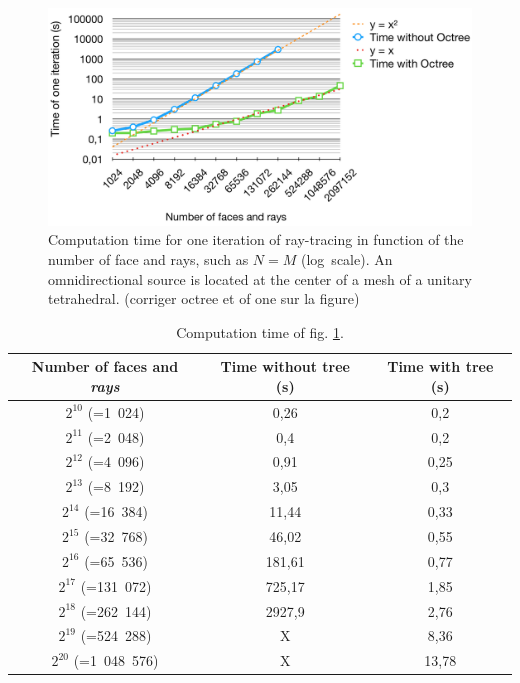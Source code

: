 \documentclass[AMA,STIX1COL]{WileyNJD-v2}
\begin{document}
\begin{figure}[t]
\centering
	\includegraphics[width=0.8\linewidth]{times}
	\caption{Computation time for one iteration of ray-tracing in function of the number of face and rays, such as $N = M$ (log~scale). An omnidirectional source is located at the center of a mesh of a unitary tetrahedral. (corriger octree et of one sur la figure)}
	\label{times}
\end{figure}
%
\begin{table}[t]
\centering
	\begin{tabular}{| c | c | c |}
		\hline
		Number of faces and \textit{rays} & Time \textbf{without} tree (s) & Time \textbf{with} tree (s)\\
		  \hline
		  \hline
		   $2^{10}$ (=1~024) & 0,26 &	0,2 \\
		   \hline
		$2^{11}$ (=2~048)  & 0,4	& 0,2 \\
		   \hline
		$2^{12}$ (=4~096) & 0,91	& 0,25\\
		   \hline
		$2^{13}$ (=8~192) & 3,05 &	0,3\\
		   \hline
		$2^{14}$ (=16~384) & 11,44	&0,33\\
		   \hline
		$2^{15}$ (=32~768) & 46,02	&0,55 \\
		     \hline
		    $2^{16}$ (=65~536) & 181,61	& 0,77\\
		   \hline
		$2^{17}$ (=131~072) & 725,17	& 1,85\\
		\hline
		$2^{18}$ (=262~144) & 2927,9 & 2,76 \\
		\hline
		$2^{19}$ (=524~288) & X & 8,36 \\
		\hline
		$2^{20}$ (=1~048~576) & X & 13,78 \\
		\hline
	 \end{tabular}
	\caption{Computation time of fig. \ref{times}.}
	\label{tabComplexite}
\end{table}
\end{document}
